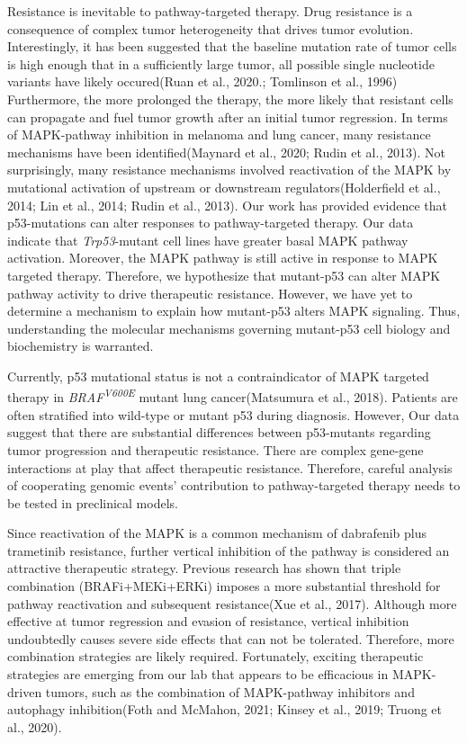 Resistance is inevitable to pathway-targeted therapy. Drug resistance is a consequence of complex tumor heterogeneity that drives tumor evolution. Interestingly, it has been suggested that the baseline mutation rate of tumor cells is high enough that in a sufficiently large tumor, all possible single nucleotide variants have likely occured(Ruan et al., 2020.; Tomlinson et al., 1996) Furthermore, the more prolonged the therapy, the more likely that resistant cells can propagate and fuel tumor growth after an initial tumor regression. In terms of MAPK-pathway inhibition in melanoma and lung cancer, many resistance mechanisms have been identified(Maynard et al., 2020; Rudin et al., 2013). Not surprisingly, many resistance mechanisms involved reactivation of the MAPK by mutational activation of upstream or downstream regulators(Holderfield et al., 2014; Lin et al., 2014; Rudin et al., 2013). Our work has provided evidence that p53-mutations can alter responses to pathway-targeted therapy.
Our data indicate that \emph{Trp53}-mutant cell lines have greater basal MAPK pathway activation. Moreover, the MAPK pathway is still active in response to MAPK targeted therapy. Therefore, we hypothesize that mutant-p53 can alter MAPK pathway activity to drive therapeutic resistance. However, we have yet to determine a mechanism to explain how mutant-p53 alters MAPK signaling. Thus, understanding the molecular mechanisms governing mutant-p53 cell biology and biochemistry is warranted.

Currently, p53 mutational status is not a contraindicator of MAPK targeted therapy in \emph{BRAF\textsuperscript{V600E}} mutant lung cancer(Matsumura et al., 2018). Patients are often stratified into wild-type or mutant p53 during diagnosis. However, Our data suggest that there are substantial differences between p53-mutants regarding tumor progression and therapeutic resistance. There are complex gene-gene interactions at play that affect therapeutic resistance. Therefore, careful analysis of cooperating genomic events' contribution to pathway-targeted therapy needs to be tested in preclinical models.

Since reactivation of the MAPK is a common mechanism of dabrafenib plus trametinib resistance, further vertical inhibition of the pathway is considered an attractive therapeutic strategy. Previous research has shown that triple combination (BRAFi+MEKi+ERKi) imposes a more substantial threshold for pathway reactivation and subsequent resistance(Xue et al., 2017). Although more effective at tumor regression and evasion of resistance, vertical inhibition undoubtedly causes severe side effects that can not be tolerated. Therefore, more combination strategies are likely required. Fortunately, exciting therapeutic strategies are emerging from our lab that appears to be efficacious in MAPK-driven tumors, such as the combination of MAPK-pathway inhibitors and autophagy inhibition(Foth and McMahon, 2021; Kinsey et al., 2019; Truong et al., 2020).

